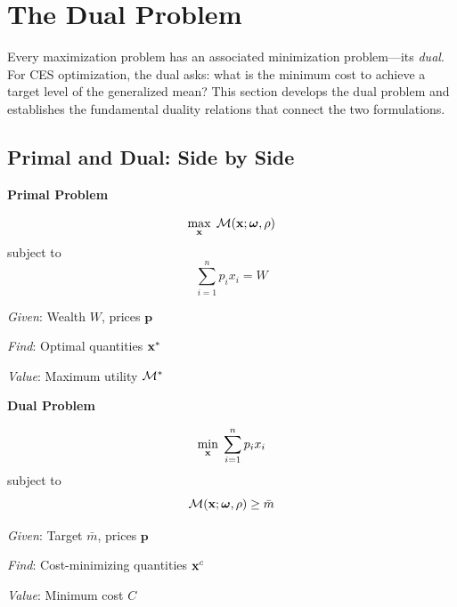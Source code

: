 \section{The Dual Problem}
\label{sec:dual-problem}

Every maximization problem has an associated minimization problem---its \emph{dual}. For CES optimization, the dual asks: what is the minimum cost to achieve a target level of the generalized mean? This section develops the dual problem and establishes the fundamental duality relations that connect the two formulations.

\subsection{Primal and Dual: Side by Side}
\label{subsec:primal-dual-setup}

\begin{tcolorbox}[
  enhanced,
  colback=white,
  colframe=gray!60,
  title={\textbf{The Two Problems}},
  fonttitle=\bfseries,
  boxrule=0.8pt,
  arc=2pt
]
\begin{minipage}[t]{0.47\textwidth}
\begin{center}
\textbf{Primal Problem}
\end{center}
\vspace{-0.5em}
\begin{equation*}
\max_{\mathbf{x}} \; \mathcal{M}(\mathbf{x}; \boldsymbol{\omega}, \rho)
\end{equation*}
subject to
\begin{equation*}
\sum_{i=1}^{n} p_i x_i = W
\end{equation*}

\medskip
\textit{Given}: Wealth $W$, prices $\mathbf{p}$

\textit{Find}: Optimal quantities $\mathbf{x}^*$

\textit{Value}: Maximum utility $\mathcal{M}^*$
\end{minipage}
\hfill
\begin{minipage}[t]{0.47\textwidth}
\begin{center}
\textbf{Dual Problem}
\end{center}
\vspace{-0.5em}
\begin{equation*}
\min_{\mathbf{x}} \; \sum_{i=1}^{n} p_i x_i
\end{equation*}
subject to
\begin{equation*}
\mathcal{M}(\mathbf{x}; \boldsymbol{\omega}, \rho) \geq \bar{m}
\end{equation*}

\medskip
\textit{Given}: Target $\bar{m}$, prices $\mathbf{p}$

\textit{Find}: Cost-minimizing quantities $\mathbf{x}^c$

\textit{Value}: Minimum cost $C$
\end{minipage}
\end{tcolorbox}


